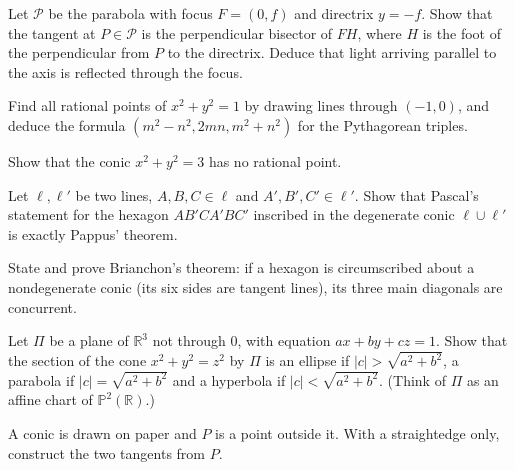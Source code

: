 \begin{exercise}[$\star$]\label{geometry:ex:parabolareflect}
Let $\mathcal P$ be the parabola with focus $F=(0,f)$ and directrix $y=-f$. Show that the tangent at $P\in\mathcal P$ is the perpendicular bisector of
$FH$, where $H$ is the foot of the perpendicular from $P$ to the directrix. Deduce that light arriving parallel to the axis is reflected through the focus.
\end{exercise}

\begin{exercise}[$\star$]\label{geometry:ex:pythagorean}
Find all rational points of $x^2+y^2=1$ by drawing lines through $(-1,0)$, and deduce the formula $(m^2-n^2,2mn,m^2+n^2)$ for the Pythagorean triples.
\end{exercise}

\begin{exercise}[$\star$]\label{geometry:ex:nothree}
Show that the conic $x^2+y^2=3$ has no rational point.
\end{exercise}

\begin{exercise}[$\star$]\label{geometry:ex:pascalpappus}
Let $\ell,\ell'$ be two lines, $A,B,C\in\ell$ and $A',B',C'\in\ell'$. Show that Pascal's statement for the hexagon $AB'CA'BC'$ inscribed in the
degenerate conic $\ell\cup\ell'$ is exactly Pappus' theorem.
\end{exercise}

\begin{exercise}[$\star$]\label{geometry:ex:brianchon}
State and prove Brianchon's theorem: if a hexagon is circumscribed about a nondegenerate conic (its six sides are tangent lines), its three main
diagonals are concurrent.
\end{exercise}

\begin{exercise}[$\star\star$]\label{geometry:ex:conesection}
Let $\Pi$ be a plane of $\mathbb R^3$ not through $0$, with equation $ax+by+cz=1$. Show that the section of the cone $x^2+y^2=z^2$ by $\Pi$ is an ellipse
if $|c|>\sqrt{a^2+b^2}$, a parabola if $|c|=\sqrt{a^2+b^2}$ and a hyperbola if $|c|<\sqrt{a^2+b^2}$. (Think of $\Pi$ as an affine chart of
$\mathbb P^2(\mathbb R)$.)
\end{exercise}

\begin{exercise}[$\star\star$]\label{geometry:ex:tangentconstruct}
A conic is drawn on paper and $P$ is a point outside it. With a straightedge only, construct the two tangents from $P$.
\end{exercise}

